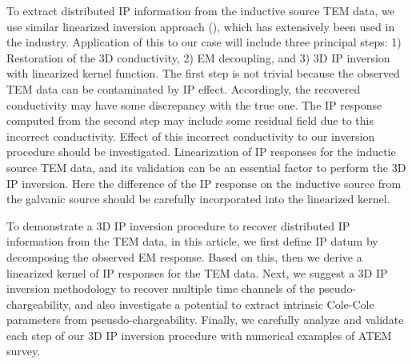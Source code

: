 \documentclass[a4paper, 11pt]{article}
\begin{document}
To extract distributed IP information from the inductive source TEM data, we use similar linearized inversion approach (\cite{seigel1959,doug1994}), which has extensively been used in the industry. Application of this to our case will include three principal steps: 1) Restoration of the 3D conductivity, 2) EM decoupling, and 3) 3D IP inversion with linearized kernel function. 
The first step is not trivial because the observed TEM data can be contaminated by IP effect. 
Accordingly, the recovered conductivity may have some discrepancy with the true one.
The IP response computed from the second step may include some residual field due to this incorrect conductivity. 
Effect of this incorrect conductivity to our inversion procedure should be investigated. 
Linearization of IP responses for the inductie source TEM data, and its validation can be an essential factor to perform the 3D IP inversion. 
Here the difference of the IP response on the inductive source from the galvanic source should be carefully incorporated into the linearized kernel.  

To demonstrate a 3D IP inversion procedure to recover distributed IP information from the TEM data, in this article, we first define IP datum by decomposing the observed EM response. 
Based on this, then we derive a linearized kernel of IP responses for the TEM data. 
Next, we suggest a 3D IP inversion methodology to recover multiple time channels of the pseudo-chargeability, and also investigate a potential to extract intrinsic Cole-Cole parameters from pseusdo-chargeability. Finally, we carefully analyze and validate each step of our 3D IP inversion procedure with numerical examples of ATEM survey.       
    
\end{document}
